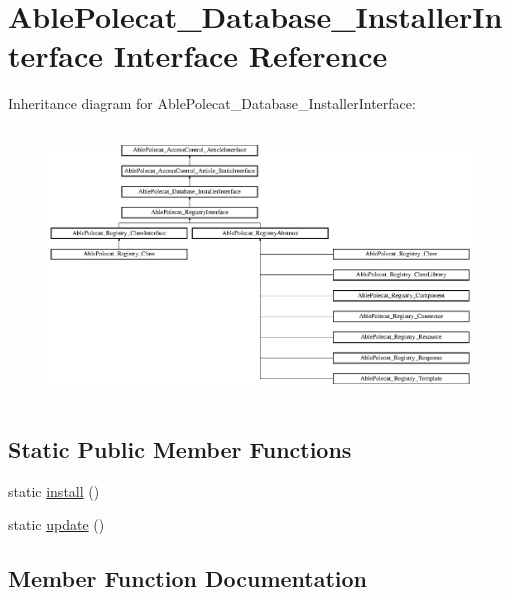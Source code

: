 \hypertarget{interface_able_polecat___database___installer_interface}{}\section{Able\+Polecat\+\_\+\+Database\+\_\+\+Installer\+Interface Interface Reference}
\label{interface_able_polecat___database___installer_interface}
Inheritance diagram for Able\+Polecat\+\_\+\+Database\+\_\+\+Installer\+Interface\+:\begin{figure}[H]
\begin{center}
\leavevmode
\includegraphics[height=7.225806cm]{interface_able_polecat___database___installer_interface}
\end{center}
\end{figure}
\subsection*{Static Public Member Functions}
\begin{DoxyCompactItemize}
\item 
static \hyperlink{interface_able_polecat___database___installer_interface_a7ee9452dbd39de4bfbe7a6dd9ed7bb65}{install} ()
\item 
static \hyperlink{interface_able_polecat___database___installer_interface_a00ce4d238d0651db584337f8e0b38c68}{update} ()
\end{DoxyCompactItemize}


\subsection{Member Function Documentation}
\hypertarget{interface_able_polecat___database___installer_interface_a7ee9452dbd39de4bfbe7a6dd9ed7bb65}{}
